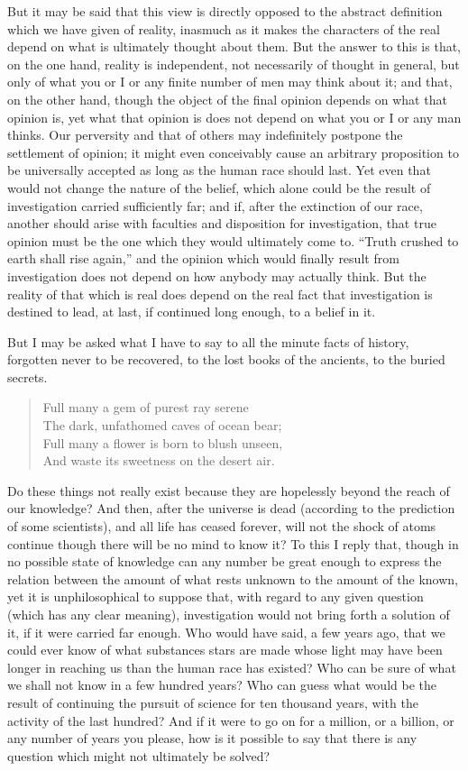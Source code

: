 But it may be said that this view is directly opposed to the abstract  definition which we have given of reality, inasmuch as it makes the characters of the real depend on what is ultimately thought about them. But the answer to this is that, on the one hand, reality is independent, not necessarily of thought in general, but only of what you or I or any finite number of men may think about it; and that, on the other hand, though the
object of the final opinion depends on what that opinion is, yet what that opinion is does not depend on what you or I or any man thinks. Our perversity and that of others may indefinitely postpone the settlement of opinion; it
might even conceivably cause an arbitrary proposition to be universally accepted as long as the human race should last. Yet even that would not change the nature of the belief, which alone could be the result of investigation
carried sufficiently far; and if, after the extinction of our race, another should arise with faculties and disposition for investigation, that true opinion must be the one which they would ultimately come to. ``Truth crushed to
earth shall rise again,'' and the opinion which would finally result from investigation does not depend on how anybody may actually think. But the reality of that which is real does depend on the real fact that investigation
is destined to lead, at last, if continued long enough, to a belief in it. 



But I may be asked what I have to say to all the minute facts of history, forgotten never to be recovered, to the lost books of the ancients, to the buried secrets.
\begin{quote}
Full many a gem of purest ray serene\\
The dark, unfathomed caves of ocean bear;\\
Full many a flower is born to blush unseen,\\
And waste its sweetness on the desert air.
\end{quote}
Do these things not really exist because they are hopelessly beyond the reach of our knowledge? And then, after the universe is dead (according to the prediction of some scientists), and all life has ceased forever, will not the shock of atoms continue though there will be no mind to know it? To this I reply that, though in no possible state of knowledge can any number be great enough to express the relation between the amount of what rests unknown to the amount of the known, yet it is unphilosophical to suppose that, with regard to any given question (which has any clear meaning), investigation would not bring forth a solution of it, if it were carried far enough. Who would have said, a few years ago, that we could ever know of what substances stars are made whose light may have been longer in reaching us than the human race has existed? Who can be sure of  what we shall not know in a few hundred years? Who can guess what would be the result of continuing the pursuit of science for ten thousand years, with the activity of the last hundred? And if it were to go on for a million, or a billion, or any number of years you please, how is it possible to say that there is any question which might not ultimately be solved?


